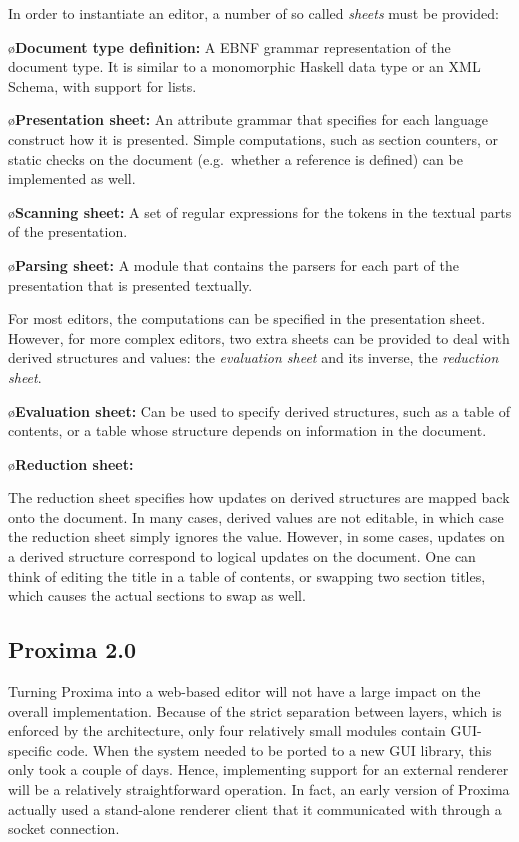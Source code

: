 \documentclass[10pt]{article}
\begin{document}
In order to instantiate an editor, a number of so called {\em sheets} must be provided:

\bl
\o{\bf Document type definition:} 
A EBNF grammar representation of the document type. It is similar to a monomorphic Haskell data type or an XML Schema, with support for lists.

\o{\bf Presentation sheet:} 
An attribute grammar that specifies for each language construct how it is presented. Simple computations, such as section counters, or static checks on the document (e.g.\ whether a reference is defined) can be implemented as well.

\o{\bf Scanning sheet:}
A set of regular expressions for the tokens in the textual parts of the presentation.

\o{\bf Parsing sheet:} 
A module that contains the parsers for each part of the presentation that is presented textually.
\el

For most editors, the computations can be specified in the presentation sheet. However, for more complex editors, two extra sheets can be provided to deal with derived structures and values: the {\em evaluation sheet} and its inverse, the {\em reduction sheet}.  

\bl
\o{\bf Evaluation sheet:}
Can be used to specify derived structures, such as a table of contents, or a table whose structure depends on information in the document. 

\o{\bf Reduction sheet:}

The reduction sheet specifies how updates on derived structures are mapped back onto the document. In many cases, derived values are not editable, in which case the reduction sheet simply ignores the value. However, in some cases, updates on a derived structure correspond to logical updates on the document. One can think of editing the title in a table of contents, or swapping two section titles, which causes the actual sections to swap as well. 
\el


\subsection{Proxima 2.0}

Turning Proxima into a web-based editor will not have a large impact on the overall implementation. Because of the strict separation between layers, which is enforced by the architecture, only four relatively small modules contain GUI-specific code. When the system needed to be ported to a new GUI library, this only took a couple of days. Hence, implementing support for an external renderer will be a relatively straightforward operation. In fact, an early version of Proxima actually used a stand-alone renderer client that it communicated with through a socket connection.
\end{document}
